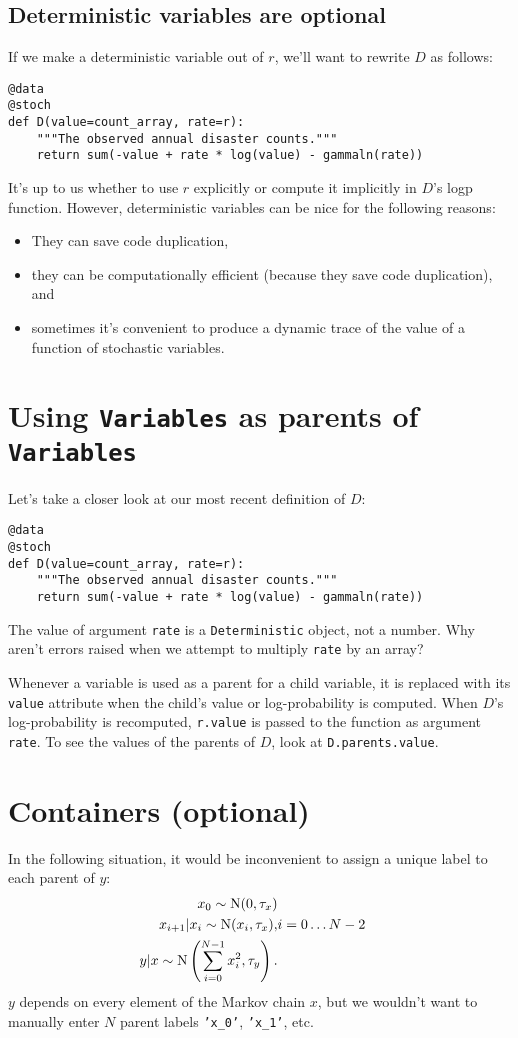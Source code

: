 \subsection{Deterministic variables are optional}
If we make a deterministic variable out of $r$, we'll want to rewrite $D$ as follows:
\begin{verbatim}
@data
@stoch
def D(value=count_array, rate=r):
    """The observed annual disaster counts."""
    return sum(-value + rate * log(value) - gammaln(rate))
\end{verbatim}
It's up to us whether to use $r$ explicitly or compute it implicitly in $D$'s logp function. However, deterministic variables can be nice for the following reasons:
\begin{itemize}
    \item They can save code duplication,    
    \item they can be computationally efficient (because they save code duplication), and
    \item sometimes it's convenient to produce a dynamic trace of the value of a function of stochastic variables.
\end{itemize}

\section{Using \texttt{Variables} as parents of \texttt{Variables}}

Let's take a closer look at our most recent definition of $D$:
\begin{verbatim}
@data
@stoch
def D(value=count_array, rate=r):
    """The observed annual disaster counts."""
    return sum(-value + rate * log(value) - gammaln(rate))
\end{verbatim}
The value of argument \texttt{rate} is a \texttt{Deterministic} object, not a number. Why aren't errors raised when we attempt to multiply \texttt{rate} by an array?

Whenever a variable is used as a parent for a child variable, it is replaced with its \texttt{value} attribute when the child's value or log-probability is computed. When $D$'s log-probability is recomputed, \texttt{r.value} is passed to the function as argument \texttt{rate}. To see the values of the parents of $D$, look at \texttt{D.parents.value}.

\section{Containers (optional)}\label{sub:container}
In the following situation, it would be inconvenient to assign a unique label to each parent of $y$:
\begin{eqnarray*}
    x_0 \sim \textup N(0,\tau_x)\\
    x_{i+1}|x_i\sim\textup{N}(x_i, \tau_x),& i=0\ldots N-2\\
    y|x \sim \textup N\left(\sum_{i=0}^{N-1}x_i^2,\tau_y\right).
\end{eqnarray*}
$y$ depends on every element of the Markov chain $x$, but we wouldn't want to manually enter $N$ parent labels \texttt{'x_0'}, \texttt{'x_1'}, etc.

